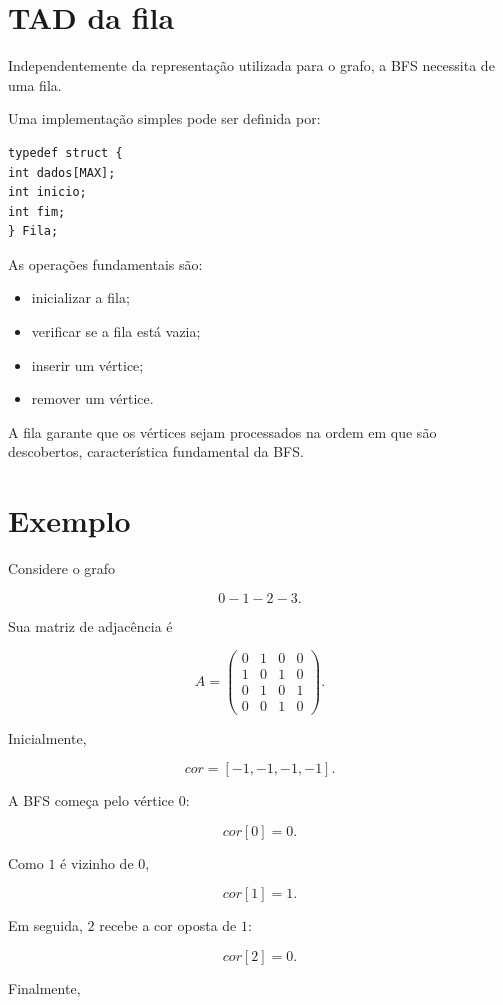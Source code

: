 \documentclass[12pt,a4paper]{article}
\begin{document}
\section{TAD da fila}

Independentemente da representação utilizada para o grafo, a BFS
necessita de uma fila.

Uma implementação simples pode ser definida por:

\begin{verbatim}
typedef struct {
int dados[MAX];
int inicio;
int fim;
} Fila;
\end{verbatim}

As operações fundamentais são:

\begin{itemize}
\item inicializar a fila;
\item verificar se a fila está vazia;
\item inserir um vértice;
\item remover um vértice.
\end{itemize}

A fila garante que os vértices sejam processados na ordem em que são
descobertos, característica fundamental da BFS.

\section{Exemplo}

Considere o grafo

$$
0-1-2-3.
$$

Sua matriz de adjacência é

$$
A=
\begin{pmatrix}
0&1&0&0\\
1&0&1&0\\
0&1&0&1\\
0&0&1&0
\end{pmatrix}.
$$

Inicialmente,

$$
cor=[-1,-1,-1,-1].
$$

A BFS começa pelo vértice $0$:

$$
cor[0]=0.
$$

Como $1$ é vizinho de $0$,

$$
cor[1]=1.
$$

Em seguida, $2$ recebe a cor oposta de $1$:

$$
cor[2]=0.
$$

Finalmente,
\end{document}

